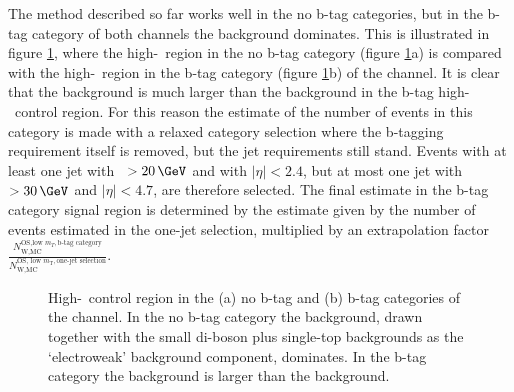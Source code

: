 The method described so far works well in the no b-tag categories, but in the b-tag category of both channels
the \ttbar background dominates. This is illustrated in figure \ref{fig:bkgs_highmtctrl}, where
the high-\mT~region in the no b-tag category (figure \ref{fig:bkgs_highmtctrl}a) is compared with the high-\mT~region in the 
b-tag category (figure \ref{fig:bkgs_highmtctrl}b) of the \etau channel. It is clear that the \ttbar 
background is much larger than the \Wjets background in the b-tag high-\mT~control region.
For this reason the estimate of the number
of \Wjets events in this category is made with a relaxed category selection where the b-tagging
requirement itself is removed, but the jet requirements still stand. Events with at least one 
jet with \pT~$>20\,\GeV$ and with $|\eta|<2.4$, but at most one jet with \pT~$>30\,\GeV$ and $|\eta|<4.7$, are therefore selected. The final \Wjets estimate in the b-tag category signal
region is determined by the estimate given by the number of \Wjets events
estimated in the one-jet selection, multiplied by an extrapolation factor 
$\frac{N_{\text{W,MC}}^{\text{OS,low } m_{T},\text{b-tag category}}}{N_{\text{W,MC}}^{\text{OS, low }m_{\text{T}},\text{one-jet selection}}}$.
\begin{figure}[h!]
\begin{center}
\end{center}
\caption[High-\mT~control region in the no b-tag and b-tag
categories of the \etau channel.]{High-\mT~control region in the (a) no b-tag and (b) b-tag categories of the \etau
channel. In the no b-tag category the \Wjets background, drawn together with the small
 di-boson plus single-top backgrounds as the `electroweak' background component, dominates. In the b-tag
category the \ttbar background is larger than the \Wjets background.}
\label{fig:bkgs_highmtctrl}
\end{figure}

